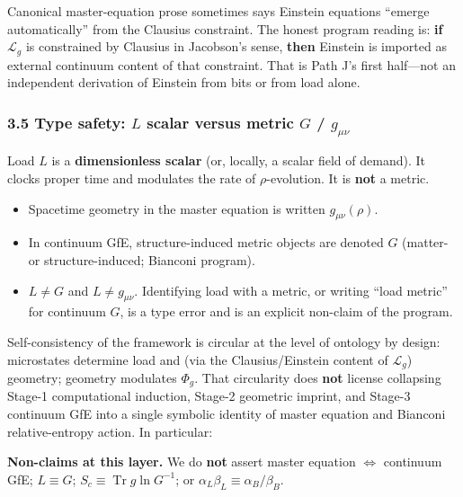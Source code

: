 \documentclass[
  11pt,
]{article}
\providecommand{\tightlist}{%
  \setlength{\itemsep}{0pt}\setlength{\parskip}{0pt}}
\begin{document}
Canonical master-equation prose sometimes says Einstein equations
``emerge automatically'' from the Clausius constraint. The honest
program reading is: \textbf{if} \(\mathcal{L}_g\) is constrained by
Clausius in Jacobson's sense, \textbf{then} Einstein is imported as
external continuum content of that constraint. That is Path J's first
half---not an independent derivation of Einstein from bits or from load
alone.

\subsubsection{\texorpdfstring{3.5 Type safety: \(L\) scalar versus
metric \(G\) /
\(g_{\mu\nu}\)}{3.5 Type safety: L scalar versus metric G / g\_\{\textbackslash mu\textbackslash nu\}}}\label{type-safety-l-scalar-versus-metric-g-g_munu}

Load \(L\) is a \textbf{dimensionless scalar} (or, locally, a scalar
field of demand). It clocks proper time and modulates the rate of
\(\rho\)-evolution. It is \textbf{not} a metric.

\begin{itemize}
\tightlist
\item
  Spacetime geometry in the master equation is written
  \(g_{\mu\nu}(\rho)\).\\
\item
  In continuum GfE, structure-induced metric objects are denoted \(G\)
  (matter- or structure-induced; Bianconi program).\\
\item
  \textbf{\(L \neq G\)} and \textbf{\(L \neq g_{\mu\nu}\)}. Identifying
  load with a metric, or writing ``load metric'' for continuum \(G\), is
  a type error and is an explicit non-claim of the program.
\end{itemize}

Self-consistency of the framework is circular at the level of ontology
by design: microstates determine load and (via the Clausius/Einstein
content of \(\mathcal{L}_g\)) geometry; geometry modulates \(\Phi_g\).
That circularity does \textbf{not} license collapsing Stage-1
computational induction, Stage-2 geometric imprint, and Stage-3
continuum GfE into a single symbolic identity of master equation and
Bianconi relative-entropy action. In particular:

\textbf{Non-claims at this layer.} We do \textbf{not} assert master
equation \(\Leftrightarrow\) continuum GfE; \(L\equiv G\);
\(S_c\equiv\operatorname{Tr} g\ln G^{-1}\); or
\(\alpha_L\beta_L\equiv\alpha_B/\beta_B\).
\end{document}
